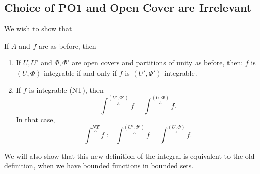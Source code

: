 \documentclass{article}
\numberwithin{equation}{section}
\begin{document}
\subsection{Choice of PO1 and Open Cover are Irrelevant}
We wish to show that 
\begin{theorem}
    If $A$ and $f$ are as before, then
    \begin{enumerate}
        \item If $U,U'$ and $\Phi,\Phi'$ are open covers and partitions of unity as before, then: $f$ is $(U,\Phi)$-integrable if and only if $f$ is $(U',\Phi')$-integrable.
        \item If $f$ is integrable (NT), then
        \begin{equation}
            \int^{(U',\Phi')}\limits_{A} f = \int^{(U,\Phi)}\limits_{A} f.
        \end{equation}
        In that case,
        \begin{equation}
            \int^{NT}\limits_{A} f := \int^{(U',\Phi')}\limits_{A} f = \int^{(U,\Phi)}\limits_{A} f.
        \end{equation}
    \end{enumerate}
\end{theorem}
We will also show that this new definition of the integral is equivalent to the old definition, when we have bounded functions in bounded sets.
\end{document}
